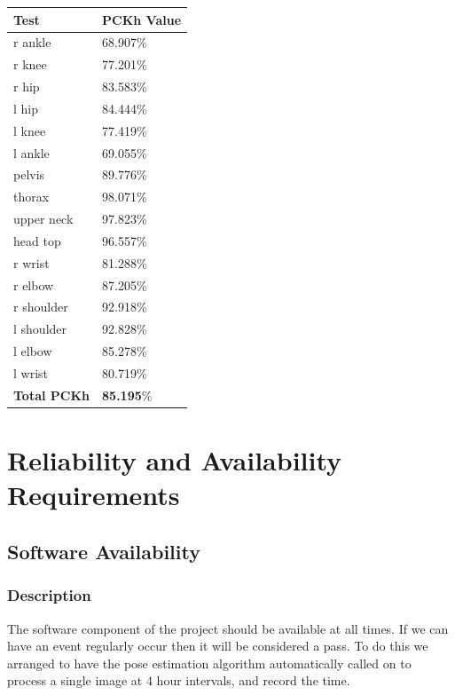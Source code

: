 \documentclass{scrreprt}
\begin{document}
\begin{table}[H]
    \centering
    \begin{tabular}{||p{2.5cm}|p{2.5cm}||}
        \hline
        \textbf{Test} & \textbf {PCKh Value}\\
         \hline\hline
        r ankle & 68.907\% \\
        \hline
        r knee &  77.201\% \\
        \hline
        r hip & 83.583\% \\
        \hline
        l hip & 84.444\% \\
        \hline
        l knee & 77.419\% \\
        \hline
        l ankle & 69.055\% \\
        \hline
        pelvis & 89.776\% \\
        \hline
        thorax & 98.071\% \\
        \hline
        upper neck & 97.823\% \\
        \hline
        head top & 96.557\% \\
        \hline
        r wrist & 81.288\% \\
        \hline
        r elbow & 87.205\% \\
        \hline
        r shoulder & 92.918\% \\
        \hline
        l shoulder & 92.828\% \\
        \hline
        l elbow & 85.278\% \\
        \hline
        l wrist & 80.719\% \\
        \hline
        \textbf {Total PCKh} & \textbf {85.195}\% \\
        \hline
    \end{tabular}
\end{table}

\section{Reliability and Availability Requirements}
\subsection{Software Availability}
\subsubsection{Description}

The software component of the project should be available at all times. If we
can have an event regularly occur then it will be considered a pass. To do this
we arranged to have the pose estimation algorithm automatically called on to
process a single image at 4 hour intervals, and record the time.
\end{document}
